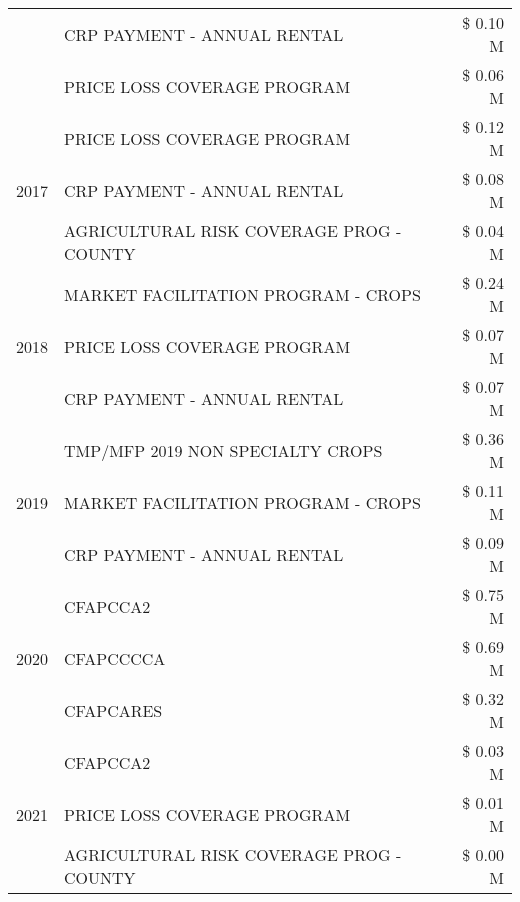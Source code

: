 \begin{tabular}{llr}
 & CRP PAYMENT - ANNUAL RENTAL & \$ 0.10 M \\
 & PRICE LOSS COVERAGE PROGRAM & \$ 0.06 M \\
\cline{1-3}
\multirow[t]{3}{*}{2017} & PRICE LOSS COVERAGE PROGRAM & \$ 0.12 M \\
 & CRP PAYMENT - ANNUAL RENTAL & \$ 0.08 M \\
 & AGRICULTURAL RISK COVERAGE PROG - COUNTY & \$ 0.04 M \\
\cline{1-3}
\multirow[t]{3}{*}{2018} & MARKET FACILITATION PROGRAM - CROPS & \$ 0.24 M \\
 & PRICE LOSS COVERAGE PROGRAM & \$ 0.07 M \\
 & CRP PAYMENT - ANNUAL RENTAL & \$ 0.07 M \\
\cline{1-3}
\multirow[t]{3}{*}{2019} & TMP/MFP 2019 NON SPECIALTY CROPS & \$ 0.36 M \\
 & MARKET FACILITATION PROGRAM - CROPS & \$ 0.11 M \\
 & CRP PAYMENT - ANNUAL RENTAL & \$ 0.09 M \\
\cline{1-3}
\multirow[t]{3}{*}{2020} & CFAPCCA2 & \$ 0.75 M \\
 & CFAPCCCCA & \$ 0.69 M \\
 & CFAPCARES & \$ 0.32 M \\
\cline{1-3}
\multirow[t]{3}{*}{2021} & CFAPCCA2 & \$ 0.03 M \\
 & PRICE LOSS COVERAGE PROGRAM & \$ 0.01 M \\
 & AGRICULTURAL RISK COVERAGE PROG - COUNTY & \$ 0.00 M \\
\cline{1-3}
\bottomrule
\end{tabular}
